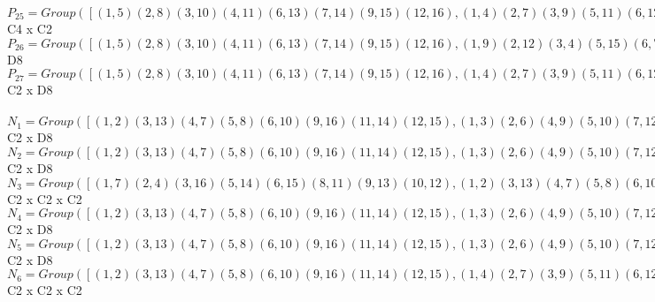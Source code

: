 \documentclass[varwidth=\maxdimen,border=10]{standalone}
\begin{document}
\begin{tabular}
$P_{25} = Group( [ ( 1, 5)( 2, 8)( 3,10)( 4,11)( 6,13)( 7,14)( 9,15)(12,16), ( 1, 4)( 2, 7)( 3, 9)( 5,11)( 6,12)( 8,14)(10,15)(13,16), ( 1,13, 5, 6)( 2,10, 8, 3)( 4,16,11,12)( 7,15,14, 9) ] )\cong$ C4 x C2\ \\
$P_{26} = Group( [ ( 1, 5)( 2, 8)( 3,10)( 4,11)( 6,13)( 7,14)( 9,15)(12,16), ( 1, 9)( 2,12)( 3, 4)( 5,15)( 6, 7)( 8,16)(10,11)(13,14), ( 1, 7)( 2, 4)( 3,16)( 5,14)( 6,15)( 8,11)( 9,13)(10,12) ] )\cong$ D8\ \\
$P_{27} = Group( [ ( 1, 5)( 2, 8)( 3,10)( 4,11)( 6,13)( 7,14)( 9,15)(12,16), ( 1, 4)( 2, 7)( 3, 9)( 5,11)( 6,12)( 8,14)(10,15)(13,16), ( 1, 3)( 2, 6)( 4, 9)( 5,10)( 7,12)( 8,13)(11,15)(14,16), ( 1, 2)( 3,13)( 4, 7)( 5, 8)( 6,10)( 9,16)(11,14)(12,15) ] )\cong$ C2 x D8\ \\
\ \\
$N_{1} = Group( [ ( 1, 2)( 3,13)( 4, 7)( 5, 8)( 6,10)( 9,16)(11,14)(12,15), ( 1, 3)( 2, 6)( 4, 9)( 5,10)( 7,12)( 8,13)(11,15)(14,16), ( 1, 4)( 2, 7)( 3, 9)( 5,11)( 6,12)( 8,14)(10,15)(13,16), ( 1, 5)( 2, 8)( 3,10)( 4,11)( 6,13)( 7,14)( 9,15)(12,16) ] )\cong$ C2 x D8\ \\
$N_{2} = Group( [ ( 1, 2)( 3,13)( 4, 7)( 5, 8)( 6,10)( 9,16)(11,14)(12,15), ( 1, 3)( 2, 6)( 4, 9)( 5,10)( 7,12)( 8,13)(11,15)(14,16), ( 1, 4)( 2, 7)( 3, 9)( 5,11)( 6,12)( 8,14)(10,15)(13,16), ( 1, 5)( 2, 8)( 3,10)( 4,11)( 6,13)( 7,14)( 9,15)(12,16) ] )\cong$ C2 x D8\ \\
$N_{3} = Group( [ ( 1, 7)( 2, 4)( 3,16)( 5,14)( 6,15)( 8,11)( 9,13)(10,12), ( 1, 2)( 3,13)( 4, 7)( 5, 8)( 6,10)( 9,16)(11,14)(12,15), ( 1, 4)( 2, 7)( 3, 9)( 5,11)( 6,12)( 8,14)(10,15)(13,16), ( 1, 8)( 2, 5)( 3, 6)( 4,14)( 7,11)( 9,12)(10,13)(15,16) ] )\cong$ C2 x C2 x C2\ \\
$N_{4} = Group( [ ( 1, 2)( 3,13)( 4, 7)( 5, 8)( 6,10)( 9,16)(11,14)(12,15), ( 1, 3)( 2, 6)( 4, 9)( 5,10)( 7,12)( 8,13)(11,15)(14,16), ( 1, 4)( 2, 7)( 3, 9)( 5,11)( 6,12)( 8,14)(10,15)(13,16), ( 1, 5)( 2, 8)( 3,10)( 4,11)( 6,13)( 7,14)( 9,15)(12,16) ] )\cong$ C2 x D8\ \\
$N_{5} = Group( [ ( 1, 2)( 3,13)( 4, 7)( 5, 8)( 6,10)( 9,16)(11,14)(12,15), ( 1, 3)( 2, 6)( 4, 9)( 5,10)( 7,12)( 8,13)(11,15)(14,16), ( 1, 4)( 2, 7)( 3, 9)( 5,11)( 6,12)( 8,14)(10,15)(13,16), ( 1, 5)( 2, 8)( 3,10)( 4,11)( 6,13)( 7,14)( 9,15)(12,16) ] )\cong$ C2 x D8\ \\
$N_{6} = Group( [ ( 1, 2)( 3,13)( 4, 7)( 5, 8)( 6,10)( 9,16)(11,14)(12,15), ( 1, 4)( 2, 7)( 3, 9)( 5,11)( 6,12)( 8,14)(10,15)(13,16), ( 1, 8)( 2, 5)( 3, 6)( 4,14)( 7,11)( 9,12)(10,13)(15,16) ] )\cong$ C2 x C2 x C2\ \\

\end{tabular}
\end{document}
